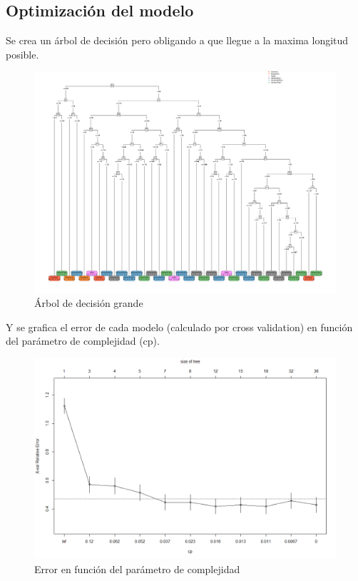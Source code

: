 \subsection{Optimización del modelo}
Se crea un árbol de decisión pero obligando a que llegue a la maxima longitud posible.
\begin{figure}[H]
	\centering
	\includegraphics[width=\linewidth]{../Ejercicio-2/ImagenesEjercicio2/bigtree.pdf}
	\caption{Árbol de decisión grande}
	\label{fig:add1grande}
\end{figure}
Y se grafica el error de cada modelo (calculado por cross validation) en función del parámetro de complejidad (cp).
\begin{figure}[H]
	\centering
	\includegraphics[width=\linewidth]{../Ejercicio-2/ImagenesEjercicio2/cp.png}
	\caption{Error en función del parámetro de complejidad}
	\label{fig:cpad}
\end{figure}

